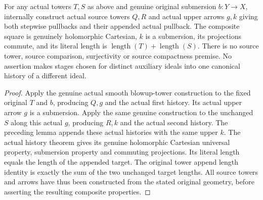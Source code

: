 \begin{theorem}
\label{hir:actual-selected-stage-composite-smooth-pullback}
\leanok
For any actual towers $T,S$ as above and genuine original submersion
$b:Y\to X$, internally construct actual source towers $Q,R$ and actual
upper arrows $g,k$ giving both stepwise pullbacks and their appended
actual pullback. The composite square is genuinely holomorphic
Cartesian, $k$ is a submersion, its projections commute, and its literal
length is $\operatorname{length}(T)+\operatorname{length}(S)$.
There is no source tower, source comparison, surjectivity or source
compactness premise. No assertion makes stages chosen for distinct
auxiliary ideals into one canonical history of a different ideal.
\end{theorem}
\begin{proof}
Apply the genuine actual smooth blowup-tower construction to the fixed
original $T$ and $b$, producing $Q,g$ and the actual first history.
Its actual upper arrow $g$ is a submersion. Apply the same genuine
construction to the unchanged $S$ along this actual $g$, producing
$R,k$ and the actual second history. The preceding lemma appends these
actual histories with the same upper $k$. The actual history theorem
gives its genuine holomorphic Cartesian universal property, submersion
property and commuting projections. Its literal length equals the
length of the appended target. The original tower append length identity
is exactly the sum of the two unchanged target lengths. All source
towers and arrows have thus been constructed from the stated original
geometry, before asserting the resulting composite properties.
\end{proof}
